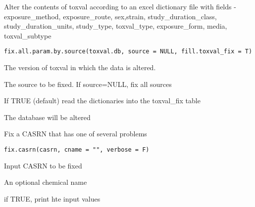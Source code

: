 \documentclass[letterpaper]{book}
\begin{document}
%
\begin{Description}\relax
Alter the contents of toxval according to an excel dictionary file with fields -
exposure\_method, exposure\_route, sex,strain, study\_duration\_class, study\_duration\_units, study\_type,
toxval\_type, exposure\_form, media, toxval\_subtype
\end{Description}
%
\begin{Usage}
\begin{verbatim}
fix.all.param.by.source(toxval.db, source = NULL, fill.toxval_fix = T)
\end{verbatim}
\end{Usage}
%
\begin{Arguments}
\begin{ldescription}
\item[\code{toxval.db}] The version of toxval in which the data is altered.

\item[\code{source}] The source to be fixed. If source=NULL, fix all sources

\item[\code{fill.toxval\_fix}] If TRUE (default) read the dictionaries into the toxval\_fix table
\end{ldescription}
\end{Arguments}
%
\begin{Value}
The database will be altered
\end{Value}
%
\begin{Description}\relax
Fix a CASRN that has one of several problems
\end{Description}
%
\begin{Usage}
\begin{verbatim}
fix.casrn(casrn, cname = "", verbose = F)
\end{verbatim}
\end{Usage}
%
\begin{Arguments}
\begin{ldescription}
\item[\code{casrn}] Input CASRN to be fixed

\item[\code{cname}] An optional chemical name

\item[\code{verbose}] if TRUE, print hte input values
\end{ldescription}
\end{Arguments}
\end{document}
